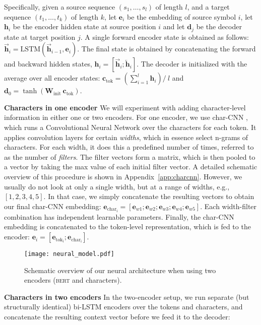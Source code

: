\documentclass[11pt,a4paper]{article}
\newcommand{\bert}{\textsc{bert}}
\newcommand{\vect}[1]{\mathbf{#1}}
\newcommand{\matr}[1]{\mathbf{#1}}
\newcommand{\inlineheader}[1]{\vspace{0.06cm}
\noindent\textbf{#1}\quad
}
\begin{document}
Specifically, given a source sequence $(s_1,\dots, s_l)$ of length $l$, and a target sequence $(t_1,\dots, t_k)$ of length $k$, let $\vect{e}_i$ be the embedding of source symbol $i$, let $\vect{h}_i$ be the encoder hidden state at source position $i$ and let $\vect{d}_j$ be the decoder state at target position $j$. A single forward encoder state is obtained as follows:  $\overrightarrow{\vect{h}}_i = \text{LSTM} (\overrightarrow{\vect{h}}_{i-1}, \vect{e}_i)$. The final state is obtained by concatenating the forward and backward hidden states,  $\vect{h}_i = [ \overrightarrow{\vect{h}}_i; \overleftarrow{\vect{h}}_i ]$. The decoder is initialized with the average over all encoder states:  $ \vect{c}_\mathrm{tok} = \left(\sum_{i=1}^{l}\vect{h}_i \right) / \: l$ and $\vect{d}_0 = \tanh \left( \matr{W}_\mathrm{init}\:  \vect{c}_\mathrm{tok} \right)$.


\inlineheader{Characters in one encoder} We will experiment with adding character-level information in either one or two encoders. For one encoder, we use char-CNN \citep{kim2016character}, which runs a Convolutional Neural Network \citep{lecuncnn:90} over the characters for each token. It applies convolution layers for certain \emph{widths}, which in essence select n-grams of characters. For each width, it does this a predefined number of times, referred to as the number of \emph{filters}. The filter vectors form a matrix, which is then pooled to a vector by taking the max value of each initial filter vector. A detailed schematic overview of this procedure is shown in Appendix~\ref{app:charcnn}. However, we usually do not look at only a single width, but at a range of widths, e.g., $\left[ 1, 2, 3, 4, 5 \right]$. In that case, we simply concatenate the resulting vectors to obtain our final char-CNN embedding: $\vect{e}_\mathrm{char_i} = \left[ \vect{e}_{w1} ; \vect{e}_{w2} ; \vect{e}_{w3} ; \vect{e}_{w4} ; \vect{e}_{w5} \right]$. Each width-filter combination has independent learnable parameters. Finally, the char-CNN embedding is concatenated to the token-level representation, which is fed to the encoder: $\vect{e}_i = [ \vect{e}_\mathrm{tok_i}; \vect{e}_\mathrm{char_i}  ]$. 


\begin{figure}[!htb]
  \texttt{[image: neural\_model.pdf]}
  \caption{Schematic overview of our neural architecture when using two encoders (\bert{} and characters).\label{fig:model}}
\end{figure}

\inlineheader{Characters in two encoders} In the two-encoder setup, we run separate (but structurally identical) bi-LSTM encoders over the tokens and characters, and concatenate the resulting context vector before we feed it to the decoder: 
\end{document}
